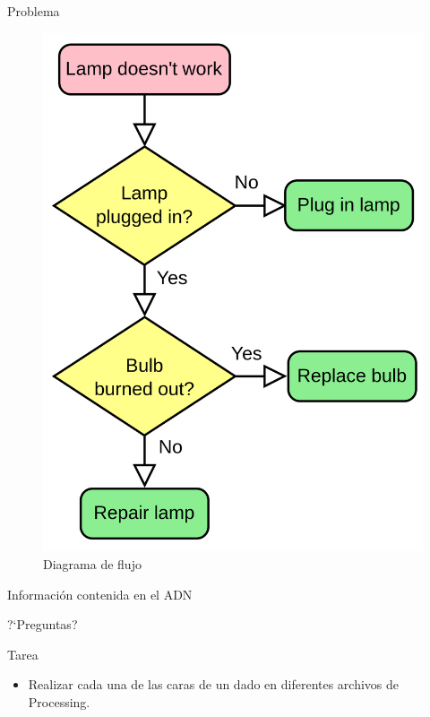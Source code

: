 \documentclass{beamer}
\begin{document}
\begin{frame}[t]{Problema}\vspace{4pt}
\begin{figure}
	\centering
	\includegraphics[scale=0.1]{problem}
	\caption{Diagrama de flujo}
\end{figure}	
\end{frame}

\begin{frame}[t]{Información contenida en el ADN}\vspace{4pt}
\end{frame}


\begin{frame}[standout]
?`Preguntas?
\end{frame}

\begin{frame}[standout]
Tarea
\begin{itemize}
	\item Realizar cada una de las caras de un dado en diferentes archivos de Processing.
\end{itemize}
\end{frame}
\end{document}
